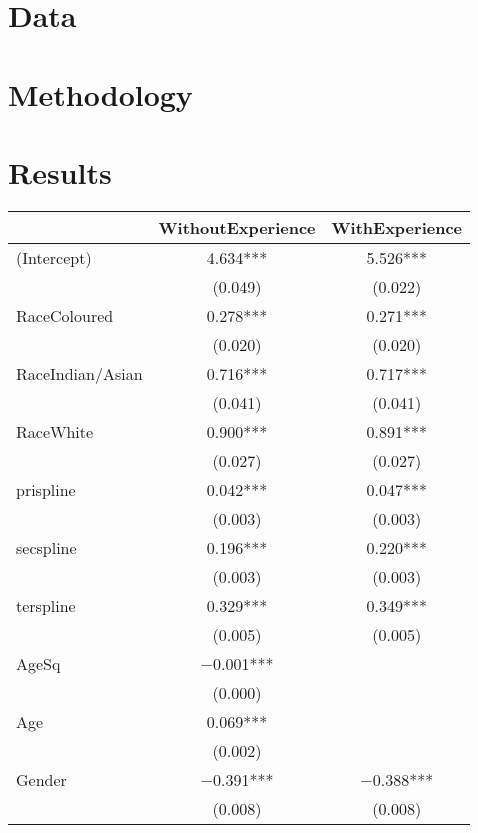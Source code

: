 \documentclass[11pt,preprint, authoryear]{elsarticle}
\let\origtable\table
\let\endorigtable\endtable
\renewenvironment{table}[1][2] {
    \expandafter\origtable\expandafter[H]
} {
    \endorigtable
}
\numberwithin{equation}{section}
\numberwithin{figure}{section}
\numberwithin{table}{section}
\begin{document}
\hypertarget{data}{%
\section{Data}\label{data}}

\hypertarget{methodology}{%
\section{Methodology}\label{methodology}}

\newpage

\hypertarget{results}{%
\section{Results}\label{results}}

\begin{table}
\centering
\begin{tabular}[t]{lcc}
\toprule
  & WithoutExperience & WithExperience\\
\midrule
(Intercept) & \num{4.634}*** & \num{5.526}***\\
 & (\num{0.049}) & (\num{0.022})\\
RaceColoured & \num{0.278}*** & \num{0.271}***\\
 & (\num{0.020}) & (\num{0.020})\\
RaceIndian/Asian & \num{0.716}*** & \num{0.717}***\\
 & (\num{0.041}) & (\num{0.041})\\
RaceWhite & \num{0.900}*** & \num{0.891}***\\
 & (\num{0.027}) & \vphantom{1} (\num{0.027})\\
prispline & \num{0.042}*** & \num{0.047}***\\
 & (\num{0.003}) & \vphantom{1} (\num{0.003})\\
secspline & \num{0.196}*** & \num{0.220}***\\
 & (\num{0.003}) & (\num{0.003})\\
terspline & \num{0.329}*** & \num{0.349}***\\
 & (\num{0.005}) & (\num{0.005})\\
AgeSq & \num{-0.001}*** & \\
 & (\num{0.000}) & \\
Age & \num{0.069}*** & \\
 & (\num{0.002}) & \\
Gender & \num{-0.391}*** & \num{-0.388}***\\
 & (\num{0.008}) & (\num{0.008})\\

\end{tabular}
\end{table}
\end{document}
